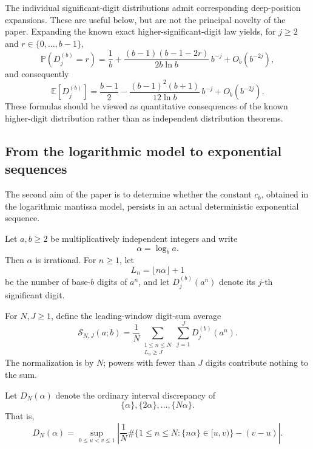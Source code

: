 \documentclass[11pt]{article}
\theoremstyle{definition}
\theoremstyle{remark}
\begin{document}
The individual significant-digit distributions admit corresponding
deep-position expansions.  These are useful below, but are not the
principal novelty of the paper.  Expanding the known exact
higher-significant-digit law yields, for \(j\ge2\) and
\(r\in\{0,\ldots,b-1\}\),
\begin{equation}
    \mathbb P(D_j^{(b)}=r)
    =
    \frac1b
    +
    \frac{(b-1)(b-1-2r)}
         {2b\ln b}\,b^{-j}
    +
    O_b(b^{-2j}),
    \label{eq:intro-digit-expansion}
\end{equation}
and consequently
\begin{equation}
    \mathbb E[D_j^{(b)}]
    =
    \frac{b-1}{2}
    -
    \frac{(b-1)^2(b+1)}
         {12\ln b}\,b^{-j}
    +
    O_b(b^{-2j}).
    \label{eq:intro-mean-digit-expansion}
\end{equation}
These formulas should be viewed as quantitative consequences of the
known higher-digit distribution rather than as independent distribution
theorems.

\subsection{From the logarithmic model to exponential sequences}
\label{subsec:intro-deterministic}

The second aim of the paper is to determine whether the constant
\(c_b\), obtained in the logarithmic mantissa model, persists in an
actual deterministic exponential sequence.

Let \(a,b\ge2\) be multiplicatively independent integers and write
\[
    \alpha=\log_b a.
\]
Then \(\alpha\) is irrational.  For \(n\ge1\), let
\[
    L_n=\lfloor n\alpha\rfloor+1
\]
be the number of base-\(b\) digits of \(a^n\), and let
\(D_j^{(b)}(a^n)\) denote its \(j\)-th significant digit.

For \(N,J\ge1\), define the leading-window digit-sum average
\begin{equation}
    \mathcal S_{N,J}(a;b)
    =
    \frac1N
    \sum_{\substack{1\le n\le N\\L_n\ge J}}
    \sum_{j=1}^{J}D_j^{(b)}(a^n).
    \label{eq:intro-SNJ}
\end{equation}
The normalization is by \(N\); powers with fewer than \(J\) digits
contribute nothing to the sum.

Let \(D_N(\alpha)\) denote the ordinary interval discrepancy of
\[
    \{\alpha\},\{2\alpha\},\ldots,\{N\alpha\}.
\]
That is,
\[
    D_N(\alpha)
    =
    \sup_{0\le u<v\le1}
    \left|
        \frac1N
        \#\{1\le n\le N:\{n\alpha\}\in[u,v)\}
        -(v-u)
    \right|.
\]
\end{document}
